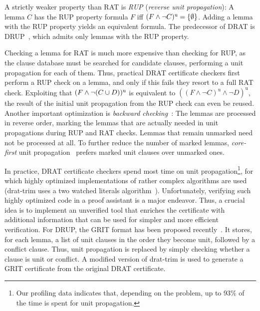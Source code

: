 \documentclass{llncs}
\begin{document}

A strictly weaker property than RAT is \emph{RUP} (\emph{reverse unit propagation}): A lemma $C$ has the RUP property \wrt formula $F$ iff $(F \wedge \neg C)^{\textrm u} = \{\emptyset\}$.
Adding a lemma with the RUP property yields an equivalent formula. The predecessor of DRAT is DRUP~\cite{HHW13}, which admits only lemmas with the RUP property.

Checking a lemma for RAT is much more expensive than checking for RUP, as the clause database must be searched for candidate clauses,
performing a unit propagation for each of them. Thus, practical DRAT certificate checkers first perform a RUP check on a lemma, and only if 
this fails they resort to a full RAT check. Exploiting that $(F\wedge\neg(C\cup D))^\textrm{u}$ is equivalent to $((F \wedge \neg C)^\textrm{u} \wedge \neg D)^\textrm{u}$,
the result of the initial unit propagation from the RUP check can even be reused.
Another important optimization is \emph{backward checking}~\cite{GoNo03,HHW13}: The lemmas are processed in reverse order, marking the lemmas that are actually needed 
in unit propagations during RUP and RAT checks. Lemmas that remain unmarked need not be processed at all. To further reduce the number of marked lemmas, 
\emph{core-first} unit propagation~\cite{WHH14} prefers marked unit clauses over unmarked ones.

In practice, DRAT certificate checkers spend most time on unit propagation\footnote{Our profiling data indicates that, depending on the problem, up to 93\% of the time is spent for unit propagation.}, for which highly optimized implementations of rather complex algorithms 
are used (\eg drat-trim uses a two watched literals algorithm~\cite{MMZZ01}).
Unfortunately, verifying such highly optimized code in a proof assistant is a major endeavor.
Thus, a crucial idea is to implement an unverified tool that enriches the certificate with additional information that can be used for simpler and more efficient verification.
For DRUP, the GRIT format has been proposed recently~\cite{CMS17}. 
It stores, for each lemma, a list of unit clauses in the order they become unit, followed by a conflict clause.
Thus, unit propagation is replaced by 
simply checking whether a clause is unit or conflict. A modified version of drat-trim is used to generate a GRIT certificate from the original DRAT certificate.
\end{document}
